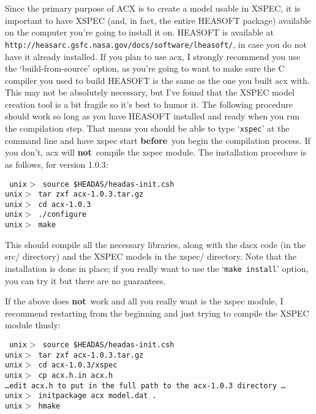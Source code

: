 \documentclass[11pt]{article}
\newcommand{\version}{1.0.3}
\begin{document}
Since the primary purpose of ACX is to create a model usable in XSPEC,
it is important to have XSPEC (and, in fact, the entire HEASOFT
package) available on the computer you're going to install it on.
HEASOFT is available at {\tt
http://heasarc.gsfc.nasa.gov/docs/software/lheasoft/}, in case you do
not have it already installed.  If you plan to use acx, I strongly
recommend you use the `build-from-source' option, as you're going to
want to make sure the C compiler you used to build HEASOFT is the same
as the one you built acx with.  This may not be absolutely necessary,
but I've found that the XSPEC model creation tool is a bit fragile so
it's best to humor it.  The following procedure should work so long as
you have HEASOFT installed and ready when you run the compilation
step.  That means you should be able to type `{\tt xspec}' at the
command line and have xspec start {\bf before}\ you begin the
compilation process.  If you don't, acx will {\bf not}\ compile the
xspec module.  The installation procedure is as follows, for version
\version:

{\tt
\noindent unix$>$ source \$HEADAS/headas-init.csh \\
\noindent unix$>$ tar zxf acx-\version.tar.gz \\
\noindent unix$>$ cd acx-\version \\
\noindent unix$>$ ./configure \\
\noindent unix$>$ make \\
}

This should compile all the necessary libraries, along with the dacx
code (in the src/ directory) and the XSPEC models in the xspec/
directory.  Note that the installation is done in place; if you really
want to use the `{\tt make install}' option, you can try it but there
are no guarantees.

If the above does {\bf not}\ work and all you really want is the xspec
module, I recommend restarting from the beginning and just trying to
compile the XSPEC module thusly:

{\tt
\noindent unix$>$ source \$HEADAS/headas-init.csh \\
\noindent unix$>$ tar zxf acx-\version.tar.gz\\
\noindent unix$>$ cd acx-\version/xspec\\
\noindent unix$>$ cp acx.h.in acx.h\\
\noindent \dots edit acx.h to put in the full path to the acx-\version
directory \dots\\
\noindent unix$>$ initpackage acx model.dat .\\
\noindent unix$>$ hmake\\
}
\end{document}
